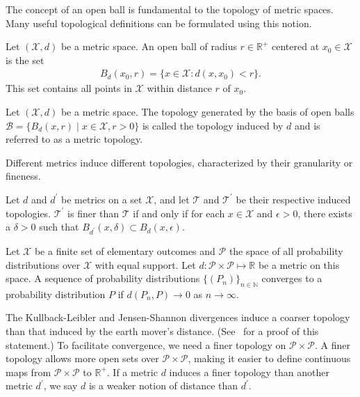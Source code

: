 The concept of an open ball is fundamental to the topology of metric spaces. Many useful topological definitions can be formulated using this notion.

\begin{definition}%
	\label{def:open-ball}
	Let $(\mathcal{X}, d)$ be a metric space. An \textnormal{\sffamily open ball} of
	radius $r \in \mathbb{R}^+$ centered at $x_0 \in \mathcal{X}$ is the set
	\begin{align}
		B_d(x_0, r) = \{ x \in \mathcal{X} : d(x, x_0) < r \}.
	\end{align}
	This set contains all points in $\mathcal{X}$ within distance $r$ of $x_0$.
\end{definition}

\begin{definition}%
	\label{def:topology2}
	Let $(\mathcal{X}, d)$ be a metric space. The topology generated by the basis of open
	balls $\mathcal{B} = \{B_d(x, r) \mid x \in \mathcal{X}, r > 0\}$ is called the
	\textnormal{\sffamily topology induced by} $d$ and is referred to as a
	\textnormal{\sffamily metric topology}.
\end{definition}

Different metrics induce different topologies, characterized by their granularity or fineness.

\begin{theorem}%
	\label{thm:granularity}
	Let $d$ and $d^\prime$ be metrics on a set $\mathcal{X}$, and let $\mathcal{T}$ and
	$\mathcal{T}^\prime$ be their respective induced topologies. $\mathcal{T}^\prime$ is
	\textnormal{\sffamily finer} than $\mathcal{T}$ if and only if for each $x \in \mathcal{X}$
	and $\epsilon > 0$, there exists a $\delta > 0$ such that $B_{d^\prime}(x,
		\delta) \subset B_d(x, \epsilon)$.
\end{theorem}

\begin{definition}%
	\label{def:convergence-metric-space}
	Let $\mathcal{X}$ be a finite set of elementary outcomes and $\mathcal{P}$ the space of
	all probability distributions over $\mathcal{X}$ with equal support. Let $d: \mathcal{P}
		\times \mathcal{P} \mapsto \mathbb{R}$ be a metric on this space. A sequence of
	probability distributions $\{(P_n)\}_{n \in \mathbb{N}}$ \textnormal{\sffamily
		converges} to a probability distribution $P$ if $d(P_n,P) \to 0$ as $n \to
		\infty$.
\end{definition}

The Kullback-Leibler and Jensen-Shannon divergences induce a coarser topology than that induced by the earth mover's distance. (See~\cite{ref:arjovsky-2017} for a proof of this statement.) To facilitate convergence, we need a finer topology on $\mathcal{P} \times \mathcal{P}$. A finer topology allows more open sets over $\mathcal{P} \times \mathcal{P}$, making it easier to define continuous maps from $\mathcal{P} \times \mathcal{P}$ to $\mathbb{R}^+$. If a metric $d$ induces a finer topology than another metric $d^\prime$, we say $d$ is a weaker notion of distance than $d^\prime$.

